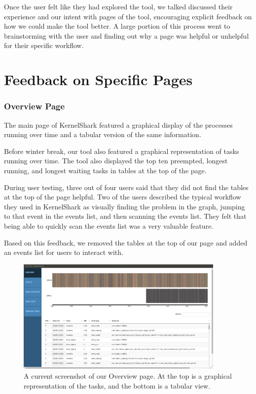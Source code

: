 \documentclass{hmcclinic}
\begin{document}
Once the user felt like they had explored the tool, we talked discussed their
experience and our intent with pages of the tool, encouraging explicit feedback
on how we could make the tool better. A large portion of this process went to
brainstorming with the user and finding out why a page was helpful or unhelpful
for their specific workflow.

\section{Feedback on Specific Pages} %

\subsubsection{Overview Page}

The main page of KernelShark featured a graphical display of the processes
running over time and a tabular version of the same information.

Before winter break, our tool also featured a graphical representation of tasks
running over time. The tool also displayed the top ten preempted, longest
running, and longest waiting tasks in tables at the top of the page. 

During user testing, three out of four users said that they did not find the
tables at the top of the page helpful. Two of the users described the typical
workflow they used in KernelShark as visually finding the problem in the graph,
jumping to that event in the events list, and then scanning the events list.
They felt that being able to quickly scan the events list was a very valuable
feature.

Based on this feedback, we removed the tables at the top of our page and added
an events list for users to interact with.

\begin{figure}[H]
\begin{center}
\includegraphics[width=4in]{overview-page.png}
\caption{A current screenshot of our Overview page. At the top is a graphical
representation of the tasks, and the bottom is a tabular view.}
\end{center}
\end{figure}
\end{document}
